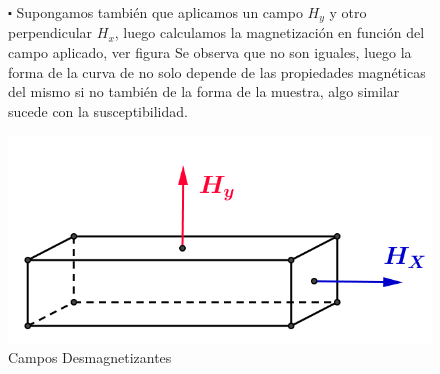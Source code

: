 \begin{figure}[H]
\begin{minipage}[b]{0.5\textwidth}
	\vspace{0pt}
$\centerdot$ Supongamos también que aplicamos un campo $H_{y}$ y otro perpendicular $H_{x}$, luego calculamos la magnetización en función del campo aplicado, ver figura Se observa que no son iguales, luego la forma de la curva de no solo depende de las propiedades magnéticas del mismo si no también de la forma de la muestra, algo similar sucede con la susceptibilidad.

\end{minipage}
\begin{minipage}[b]{0.45\linewidth}
	\raggedright
    \includegraphics[width=1.0\textwidth]{./Figures/campoDesmagnetizante0}
    \caption{Campos Desmagnetizantes}
    \label{fig:cdm0}
    \vspace{0.5cm}
\end{minipage}

\end{figure}


